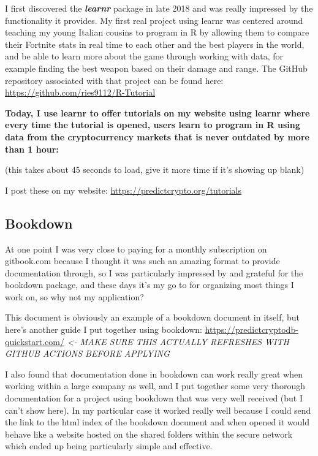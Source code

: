 \documentclass[
]{book}
\begin{document}
I first discovered the \textbf{\emph{learnr}} \citep{R-learnr} package in late 2018 and was really impressed by the functionality it provides. My first real project using learnr was centered around teaching my young Italian cousins to program in R by allowing them to compare their Fortnite stats in real time to each other and the best players in the world, and be able to learn more about the game through working with data, for example finding the best weapon based on their damage and range. The GitHub repository associated with that project can be found here: \url{https://github.com/ries9112/R-Tutorial}

\textbf{Today, I use learnr to offer tutorials on my website using learnr where every time the tutorial is opened, users learn to program in R using data from the cryptocurrency markets that is never outdated by more than 1 hour:}

(this takes about 45 seconds to load, give it more time if it's showing up blank)

I post these on my website: \url{https://predictcrypto.org/tutorials}

\hypertarget{bookdown}{%
\subsection{Bookdown}\label{bookdown}}

At one point I was very close to paying for a monthly subscription on gitbook.com because I thought it was such an amazing format to provide documentation through, so I was particularly impressed by and grateful for the bookdown \citep{R-bookdown} package, and these days it's my go to for organizing most things I work on, so why not my application?

This document is obviously an example of a bookdown document in itself, but here's another guide I put together using bookdown: \url{https://predictcryptodb-quickstart.com/} \emph{\textless- MAKE SURE THIS ACTUALLY REFRESHES WITH GITHUB ACTIONS BEFORE APPLYING}

I also found that documentation done in bookdown can work really great when working within a large company as well, and I put together some very thorough documentation for a project using bookdown that was very well received (but I can't show here). In my particular case it worked really well because I could send the link to the html index of the bookdown document and when opened it would behave like a website hosted on the shared folders within the secure network which ended up being particularly simple and effective.
\end{document}
